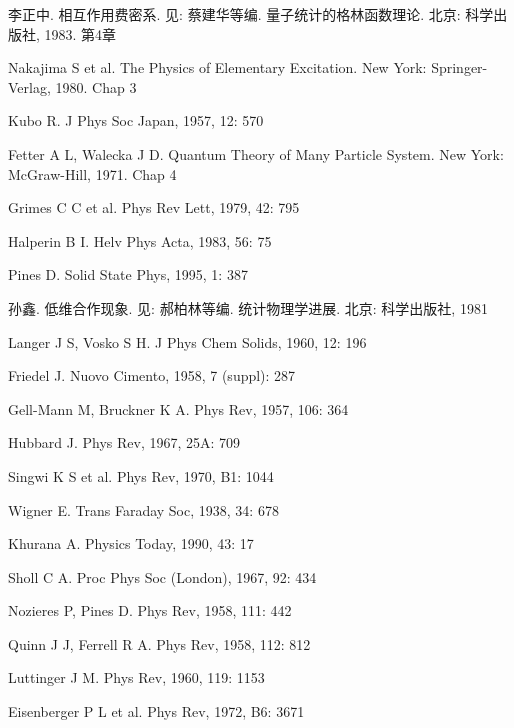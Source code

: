 \begin{canKao}
\begin{enumerate}[label={[\arabic*]}, leftmargin=2.2em, itemsep=0pt]
\item 李正中. 相互作用费密系. 见: 蔡建华等编. 量子统计的格林函数理论. 北京: 科学出版社, 1983. 第4章
\item Nakajima S et al. The Physics of Elementary Excitation. New York: Springer-Verlag, 1980. Chap 3
\item Kubo R. J Phys Soc Japan, 1957, 12: 570
\item Fetter A L, Walecka J D. Quantum Theory of Many Particle System. New York: McGraw-Hill, 1971. Chap 4
\item Grimes C C et al. Phys Rev Lett, 1979, 42: 795
\item Halperin B I. Helv Phys Acta, 1983, 56: 75
\item Pines D. Solid State Phys, 1995, 1: 387
\item 孙鑫. 低维合作现象. 见: 郝柏林等编. 统计物理学进展. 北京: 科学出版社, 1981
\item Langer J S, Vosko S H. J Phys Chem Solids, 1960, 12: 196
\item Friedel J. Nuovo Cimento, 1958, 7 (suppl): 287
\item Gell-Mann M, Bruckner K A. Phys Rev, 1957, 106: 364
\item Hubbard J. Phys Rev, 1967, 25A: 709
\item Singwi K S et al. Phys Rev, 1970, B1: 1044
\item Wigner E. Trans Faraday Soc, 1938, 34: 678
\item Khurana A. Physics Today, 1990, 43: 17
\item Sholl C A. Proc Phys Soc (London), 1967, 92: 434
\item Nozieres P, Pines D. Phys Rev, 1958, 111: 442
\item Quinn J J, Ferrell R A. Phys Rev, 1958, 112: 812
\item Luttinger J M. Phys Rev, 1960, 119: 1153
\item Eisenberger P L et al. Phys Rev, 1972, B6: 3671
\end{enumerate}
\end{canKao}

